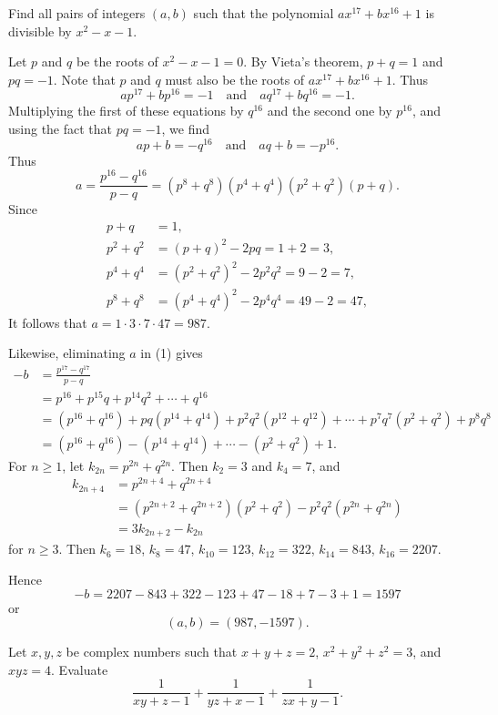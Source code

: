 \begin{prbm}
Find all pairs of integers $(a,b)$ such that the polynomial $ax^{17}+bx^{16}+1$ is divisible by $x^2-x-1$.
\end{prbm}

\begin{solution}
Let $p$ and $q$ be the roots of $x^2-x-1=0$. By Vieta’s theorem, $p+q=1$ and $pq=-1$. Note that $p$ and $q$ must also be the roots of $ax^{17}+bx^{16}+1$. Thus
\[ ap^{17}+bp^{16}=-1 \quad \text{and} \quad aq^{17}+bq^{16}=-1. \]
Multiplying the first of these equations by $q^{16}$ and the second one by $p^{16}$, and using the fact that $pq=-1$, we find
\begin{equation*}\tag{1}
ap+b=-q^{16} \quad \text{and} \quad aq+b=-p^{16}.
\end{equation*}
Thus
\[ a=\frac{p^{16}-q^{16}}{p-q}=(p^8+q^8)(p^4+q^4)(p^2+q^2)(p+q). \]
Since
\begin{align*}
p+q &= 1, \\
p^2+q^2 &= (p+q)^2-2pq=1+2=3, \\
p^4+q^4 &= (p^2+q^2)^2-2p^2q^2=9-2=7, \\
p^8+q^8 &= (p^4+q^4)^2-2p^4q^4=49-2=47,
\end{align*}
It follows that $a=1\cdot3\cdot7\cdot47=987$.

Likewise, eliminating $a$ in (1) gives
\begin{align*}
-b&=\frac{p^{17}-q^{17}}{p-q}\\
&=p^{16}+p^{15}q+p^{14}q^2+\cdots+q^{16}\\
&=(p^{16}+q^{16})+pq(p^{14}+q^{14})+p^2q^2(p^{12}+q^{12})+\cdots+p^7q^7(p^2+q^2)+p^8q^8\\
&=(p^{16}+q^{16})-(p^{14}+q^{14})+\cdots-(p^2+q^2)+1.
\end{align*}
For $n\ge1$, let $k_{2n}=p^{2n}+q^{2n}$. Then $k_2=3$ and $k_4=7$, and
\begin{align*}
k_{2n+4}&=p^{2n+4}+q^{2n+4}\\
&=(p^{2n+2}+q^{2n+2})(p^2+q^2)-p^2q^2(p^{2n}+q^{2n})\\
&=3k_{2n+2}-k_{2n}
\end{align*}
for $n\ge3$. Then $k_6=18$, $k_8=47$, $k_{10}=123$, $k_{12}=322$, $k_{14}=843$, $k_{16}=2207$.

Hence
\[ -b=2207-843+322-123+47-18+7-3+1=1597 \]
or
\[ (a,b)=(987,-1597). \]
\end{solution}
\pagebreak

\begin{prbm}
Let $x,y,z$ be complex numbers such that $x+y+z=2$, $x^2+y^2+z^2=3$, and $xyz=4$. Evaluate
\[ \frac{1}{xy+z-1}+\frac{1}{yz+x-1}+\frac{1}{zx+y-1}. \]
\end{prbm}

